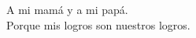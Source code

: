 
\vspace*{3cm}

\begin{center}
    A mi mamá y a mi papá. \\
    Porque mis logros son nuestros logros.
\end{center}

\medskip
\cleardoublepage